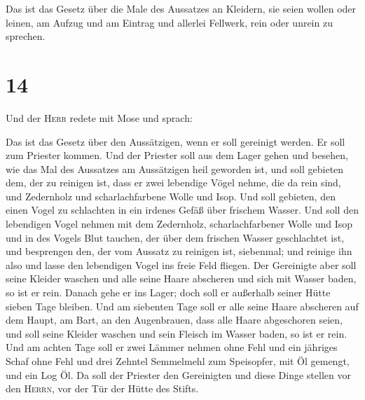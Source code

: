  Das ist das Gesetz über die Male des Aussatzes an
Kleidern, sie seien wollen oder leinen, am Aufzug und am Eintrag und
allerlei Fellwerk, rein oder unrein zu sprechen.

\hypertarget{section-13}{%
\section{14}\label{section-13}}

 Und der \textsc{Herr} redete mit Mose und sprach:

 Das ist das Gesetz über den Aussätzigen, wenn er soll
gereinigt werden. Er soll zum Priester kommen.  Und der
Priester soll aus dem Lager gehen und besehen, wie das Mal des Aussatzes
am Aussätzigen heil geworden ist,  und soll gebieten dem,
der zu reinigen ist, dass er zwei lebendige Vögel nehme, die da rein
sind, und Zedernholz und scharlachfarbene Wolle und Isop. 
Und soll gebieten, den einen Vogel zu schlachten in ein irdenes Gefäß
über frischem Wasser.  Und soll den lebendigen Vogel
nehmen mit dem Zedernholz, scharlachfarbener Wolle und Isop und in des
Vogels Blut tauchen, der über dem frischen Wasser geschlachtet ist,
 und besprengen den, der vom Aussatz zu reinigen ist,
siebenmal; und reinige ihn also und lasse den lebendigen Vogel ins freie
Feld fliegen.  Der Gereinigte aber soll seine Kleider
waschen und alle seine Haare abscheren und sich mit Wasser baden, so ist
er rein. Danach gehe er ins Lager; doch soll er außerhalb seiner Hütte
sieben Tage bleiben.  Und am siebenten Tage soll er alle
seine Haare abscheren auf dem Haupt, am Bart, an den Augenbrauen, dass
alle Haare abgeschoren seien, und soll seine Kleider waschen und sein
Fleisch im Wasser baden, so ist er rein.  Und am achten
Tage soll er zwei Lämmer nehmen ohne Fehl und ein jähriges Schaf ohne
Fehl und drei Zehntel Semmelmehl zum Speisopfer, mit Öl gemengt, und ein
Log Öl.  Da soll der Priester den Gereinigten und diese
Dinge stellen vor den \textsc{Herrn}, vor der Tür der Hütte des Stifts.

